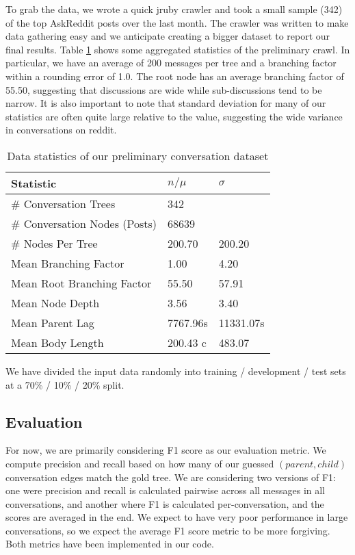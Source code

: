 \documentclass[10pt]{article}
\begin{document}
To grab the data, we wrote a quick jruby crawler and took a small sample (342) of the top
AskReddit posts over the last month. The crawler was written to make data gathering easy
and we anticipate creating a bigger dataset to report our final results. Table \ref{table:stats}
shows some aggregated statistics of the preliminary crawl. In particular, we have an average
of 200 messages per tree and a branching factor within a rounding error of 1.0. The root
node has an average branching factor of 55.50, suggesting that discussions are wide while
sub-discussions tend to be narrow. It is also important to note that standard
deviation for many of our statistics are often quite large relative to the
value, suggesting the wide variance in conversations on reddit.

\begin{table}[h]\footnotesize
 \begin{tabular}{| l | l | l |} 
   \hline
   \textbf{Statistic} & \textbf{$n / \mu$} & \textbf{$\sigma$} \\
   \hline
    \# Conversation Trees &  342 & \\
    \# Conversation Nodes (Posts) & 68639 & \\
    \# Nodes Per Tree &  200.70 & 200.20 \\
    Mean Branching Factor & 1.00 & 4.20 \\
    Mean Root Branching Factor &  55.50 & 57.91 \\
    Mean Node Depth  & 3.56 & 3.40 \\
    Mean Parent Lag & 7767.96s & 11331.07s \\
    Mean Body Length & 200.43 c & 483.07 \\
   \hline
  \end{tabular}
  \caption{Data statistics of our preliminary conversation dataset}
  \label{table:stats}
\end{table}

We have divided the input data randomly into training / development / test sets
at a 70\% / 10\% / 20\% split.

\subsection{Evaluation}
For now, we are primarily considering F1 score as our evaluation metric. We
compute precision and recall based on how many of our guessed $(parent,child)$
conversation edges match the gold tree. We are considering two
versions of F1: one were precision and recall is calculated pairwise across all
messages in all conversations, and another where F1 is calculated
per-conversation, and the scores are averaged in the end. We expect to have
very poor performance in large conversations, so we expect the average F1 score metric to be
more forgiving. Both metrics have been implemented in our code.
\end{document}
